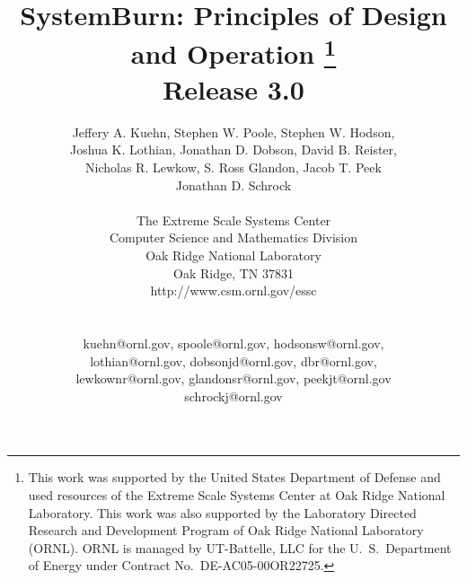 \title{
	SystemBurn: Principles of Design and Operation
	\footnote{
		This work was supported by the United States Department of Defense and used resources of the
		Extreme Scale Systems Center at Oak Ridge National Laboratory.
		This work was also supported by the Laboratory Directed Research and
		Development Program of Oak Ridge National Laboratory (ORNL). ORNL is managed by UT-Battelle,
		LLC for the U.~S.~Department of Energy under Contract No.~DE-AC05-00OR22725.
	} \\
	Release 3.0\\
}

\author{
Jeffery A. Kuehn, Stephen W. Poole, Stephen W. Hodson,\\
Joshua K. Lothian, Jonathan D. Dobson, David B. Reister, \\
Nicholas R. Lewkow, S. Ross Glandon, Jacob T. Peek \\
Jonathan D. Schrock\\
\\
The Extreme Scale Systems Center \\
Computer Science and Mathematics Division \\
Oak Ridge National Laboratory \\
Oak Ridge, TN 37831 \\
http://www.csm.ornl.gov/essc\\
\\
\\
kuehn@ornl.gov, spoole@ornl.gov, hodsonsw@ornl.gov,\\
lothian@ornl.gov, dobsonjd@ornl.gov, dbr@ornl.gov, \\
lewkownr@ornl.gov, glandonsr@ornl.gov, peekjt@ornl.gov\\
schrockj@ornl.gov\\
}
\maketitle
